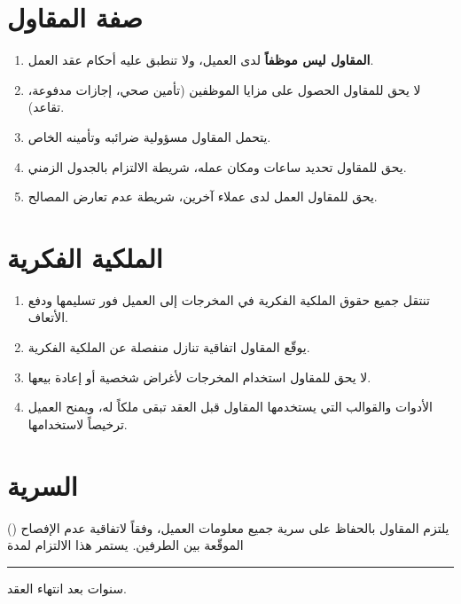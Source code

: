\documentclass[12pt,a4paper]{article}
\begin{document}
\section{صفة المقاول}
\label{sec:status}
\begin{enumerate}
    \item \textbf{المقاول ليس موظفاً} لدى العميل، ولا تنطبق عليه أحكام عقد العمل.
    \item لا يحق للمقاول الحصول على مزايا الموظفين (تأمين صحي، إجازات مدفوعة، تقاعد).
    \item يتحمل المقاول مسؤولية ضرائبه وتأمينه الخاص.
    \item يحق للمقاول تحديد ساعات ومكان عمله، شريطة الالتزام بالجدول الزمني.
    \item يحق للمقاول العمل لدى عملاء آخرين، شريطة عدم تعارض المصالح.
\end{enumerate}

\section{الملكية الفكرية}
\label{sec:ip}
\begin{enumerate}
    \item تنتقل جميع حقوق الملكية الفكرية في المخرجات إلى العميل فور تسليمها ودفع الأتعاف.
    \item يوقّع المقاول اتفاقية تنازل منفصلة عن الملكية الفكرية.
    \item لا يحق للمقاول استخدام المخرجات لأغراض شخصية أو إعادة بيعها.
    \item الأدوات والقوالب التي يستخدمها المقاول قبل العقد تبقى ملكاً له، ويمنح العميل ترخيصاً لاستخدامها.
\end{enumerate}

\section{السرية}
\label{sec:confidentiality}
يلتزم المقاول بالحفاظ على سرية جميع معلومات العميل، وفقاً لاتفاقية عدم الإفصاح () الموقّعة بين الطرفين. يستمر هذا الالتزام لمدة \rule{2cm}{0.4pt} سنوات بعد انتهاء العقد.
\end{document}
